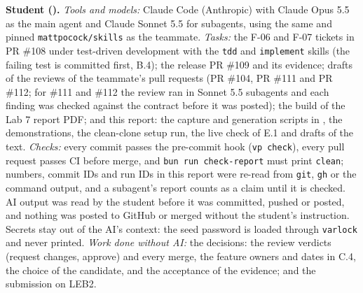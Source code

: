 \begin{sloppypar}
\textbf{Student \studentOneId{} (\studentOneName).} \textit{Tools and models:} Claude Code (Anthropic) with Claude Opus 5.5 as the main agent and Claude Sonnet 5.5 for subagents, using the same  and pinned \texttt{mattpocock/skills} as the teammate. \textit{Tasks:} the F-06 and F-07 tickets in PR \#108 under test-driven development with the \texttt{tdd} and \texttt{implement} skills (the failing test is committed first, B.4); the release PR \#109 and its evidence; drafts of the reviews of the teammate's pull requests (PR \#104, PR \#111 and PR \#112; for \#111 and \#112 the review ran in Sonnet 5.5 subagents and each finding was checked against the contract before it was posted); the build of the Lab 7 report PDF; and this report: the capture and generation scripts in , the demonstrations, the clean-clone setup run, the live check of E.1 and drafts of the text. \textit{Checks:} every commit passes the pre-commit hook (\texttt{vp check}), every pull request passes CI before merge, and \texttt{bun run check-report} must print \texttt{clean}; numbers, commit IDs and run IDs in this report were re-read from \texttt{git}, \texttt{gh} or the command output, and a subagent's report counts as a claim until it is checked. AI output was read by the student before it was committed, pushed or posted, and nothing was posted to GitHub or merged without the student's instruction. Secrets stay out of the AI's context: the seed password is loaded through \texttt{varlock} and never printed. \textit{Work done without AI:} the decisions: the review verdicts (request changes, approve) and every merge, the feature owners and dates in C.4, the choice of the candidate, and the acceptance of the evidence; and the submission on LEB2.
\end{sloppypar}

